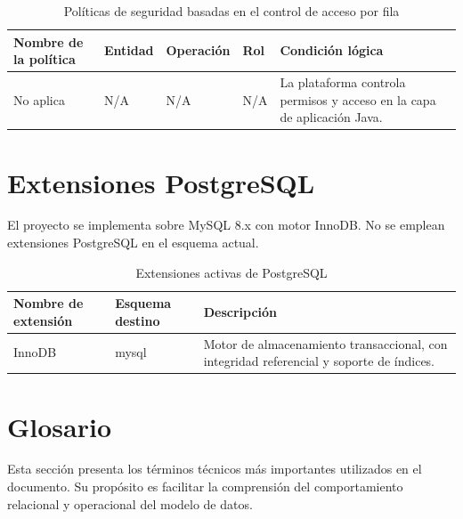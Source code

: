 \documentclass[12pt,letterpaper]{article}
\providecommand{\toprule}{}
\providecommand{\midrule}{}
\renewcommand{\toprule}{\hline}
\renewcommand{\midrule}{\hline}
\newcommand{\code}[1]{\texorpdfstring{\begingroup\normalfont\normalsize\def\_{\textunderscore\allowbreak}#1\endgroup}{#1}}
\begin{document}
\begin{longtable}{|L{0.24\textwidth}|L{0.14\textwidth}|L{0.12\textwidth}|L{0.16\textwidth}|L{0.24\textwidth}|}
\caption{Políticas de seguridad basadas en el control de acceso por fila}\\
\toprule
\textbf{Nombre de la política} & \textbf{Entidad} & \textbf{Operación} & \textbf{Rol} & \textbf{Condición lógica} \\
\midrule
No aplica & N/A & N/A & N/A & La plataforma controla permisos y acceso en la capa de aplicación Java. \\
\end{longtable}

\section{Extensiones PostgreSQL}

El proyecto se implementa sobre MySQL 8.x con motor InnoDB. No se emplean extensiones PostgreSQL en el esquema actual.

\begin{longtable}{|L{0.22\textwidth}|L{0.18\textwidth}|L{0.50\textwidth}|}
\caption{Extensiones activas de PostgreSQL}\\
\toprule
\textbf{Nombre de extensión} & \textbf{Esquema destino} & \textbf{Descripción} \\
\midrule
\code{InnoDB} & \code{mysql} & Motor de almacenamiento transaccional, con integridad referencial y soporte de índices. \\
\end{longtable}

\section{Glosario}

Esta sección presenta los términos técnicos más importantes utilizados en el documento. Su propósito es facilitar la comprensión del comportamiento relacional y operacional del modelo de datos.
\end{document}
